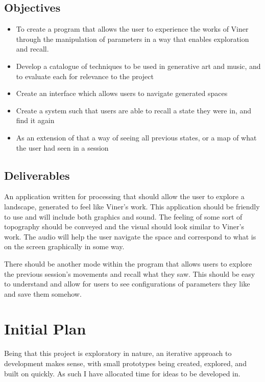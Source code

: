 \subsection{Objectives}

\begin{itemize}
    \item To create a program that allows the user to experience the works of
        Viner through the manipulation of parameters in a way that enables
        exploration and recall.
    \item Develop a catalogue of techniques to be used in generative art and
        music, and to evaluate each for relevance to the project
    \item Create an interface which allows users to navigate generated spaces
    \item Create a system such that users are able to recall a state they were
        in, and find it again
    \item As an extension of that a way of seeing all previous states, or a map
        of what the user had seen in a session
\end{itemize}

\subsection{Deliverables}
An application written for processing that should allow the user to explore a
landscape, generated to feel like Viner's work. This application should be
friendly to use and will include both graphics and sound. The feeling of some
sort of topography should be conveyed and the visual should look similar to
Viner's work. The audio will help the user navigate the space and correspond to
what is on the screen graphically in some way.

There should be another mode within the program that allows users to explore the
previous session's movements and recall what they saw. This should be easy to
understand and allow for users to see configurations of parameters they like and
save them somehow.

\section{Initial Plan}
Being that this project is exploratory in nature, an iterative approach to
development makes sense, with small prototypes being created, explored, and
built on quickly. As such I have allocated time for ideas to be developed in.

